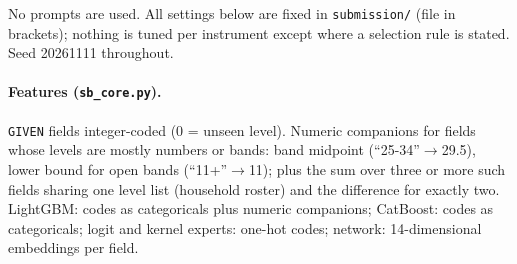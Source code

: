 No prompts are used. All settings below are fixed in \texttt{submission/} (file in brackets); nothing is tuned per instrument except where a selection rule is stated. Seed 20261111 throughout.

\paragraph{Features (\texttt{sb\_core.py}).} \texttt{GIVEN} fields integer-coded (0 = unseen level). Numeric companions for fields whose levels are mostly numbers or bands: band midpoint (``25-34''$\to$29.5), lower bound for open bands (``11+''$\to$11); plus the sum over three or more such fields sharing one level list (household roster) and the difference for exactly two. LightGBM: codes as categoricals plus numeric companions; CatBoost: codes as categoricals; logit and kernel experts: one-hot codes; network: 14-dimensional embeddings per field.

